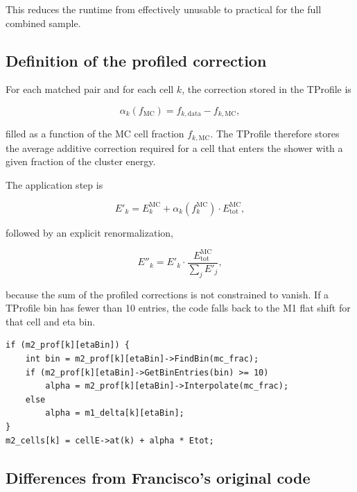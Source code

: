\documentclass[11pt,a4paper]{article}
\begin{document}
This reduces the runtime from effectively unusable to practical for the full
combined sample.

\subsection{Definition of the profiled correction}

For each matched pair and for each cell $k$, the correction stored in the
TProfile is

\begin{equation}
  \alpha_k(f_{\mathrm{MC}}) = f_{k,\mathrm{data}} - f_{k,\mathrm{MC}},
\end{equation}

filled as a function of the MC cell fraction $f_{k,\mathrm{MC}}$. The TProfile
therefore stores the average additive correction required for a cell that enters
the shower with a given fraction of the cluster energy.

The application step is

\begin{equation}
  E'_k = E_k^{\mathrm{MC}} + \alpha_k(f_k^{\mathrm{MC}}) \cdot E_{\mathrm{tot}}^{\mathrm{MC}},
\end{equation}

followed by an explicit renormalization,

\begin{equation}
  E''_k = E'_k \cdot \frac{E_{\mathrm{tot}}^{\mathrm{MC}}}{\sum_j E'_j},
\end{equation}

because the sum of the profiled corrections is not constrained to vanish. If a
TProfile bin has fewer than 10 entries, the code falls back to the M1 flat
shift for that cell and eta bin.

\begin{lstlisting}
if (m2_prof[k][etaBin]) {
    int bin = m2_prof[k][etaBin]->FindBin(mc_frac);
    if (m2_prof[k][etaBin]->GetBinEntries(bin) >= 10)
        alpha = m2_prof[k][etaBin]->Interpolate(mc_frac);
    else
        alpha = m1_delta[k][etaBin];
}
m2_cells[k] = cellE->at(k) + alpha * Etot;
\end{lstlisting}

\subsection{Differences from Francisco's original code}
\end{document}
